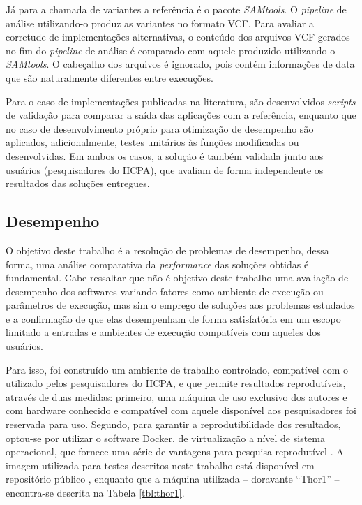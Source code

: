 \documentclass[cic,tc]{iiufrgs}
\begin{document}
Já para a chamada de variantes a referência é o pacote \textit{SAMtools}. O
\textit{pipeline} de análise utilizando-o produz as variantes no formato VCF.
Para avaliar a corretude de implementações alternativas, o conteúdo dos
arquivos VCF gerados no fim do \textit{pipeline} de análise é comparado com
aquele produzido utilizando o \textit{SAMtools}. O cabeçalho dos arquivos é
ignorado, pois contém informações de data que são naturalmente diferentes entre
execuções.

Para o caso de implementações publicadas na literatura, são desenvolvidos
\textit{scripts} de validação para comparar a saída das aplicações com a
referência, enquanto que no caso de desenvolvimento próprio para otimização de
desempenho são aplicados, adicionalmente, testes unitários às funções
modificadas ou desenvolvidas. Em ambos os casos, a solução é também validada
junto aos usuários (pesquisadores do HCPA), que avaliam de forma independente
os resultados das soluções entregues.

\subsection{Desempenho}
\label{sec:perfmethod}

O objetivo deste trabalho é a resolução de problemas de desempenho, dessa
forma, uma análise comparativa da \textit{performance} das soluções obtidas é
fundamental. Cabe ressaltar que não é objetivo deste trabalho uma avaliação de
desempenho dos softwares variando fatores como ambiente de execução ou
parâmetros de execução, mas sim o emprego de soluções aos problemas estudados e
a confirmação de que elas desempenham de forma satisfatória em um escopo
limitado a entradas e ambientes de execução compatíveis com aqueles dos
usuários.

Para isso, foi construído um ambiente de trabalho controlado, compatível com o
utilizado pelos pesquisadores do HCPA, e que permite resultados reprodutíveis,
através de duas medidas: primeiro, uma máquina de uso exclusivo dos autores e
com hardware conhecido e compatível com aquele disponível aos pesquisadores foi
reservada para uso. Segundo, para garantir a reprodutibilidade dos resultados,
optou-se por utilizar o software Docker, de virtualização a nível de sistema
operacional, que fornece uma série de vantagens para pesquisa reprodutível
\cite{boettiger2015introduction}. A imagem utilizada para testes descritos
neste trabalho está disponível em repositório público \cite{dockerme}, enquanto
que a máquina utilizada -- doravante ``Thor1'' -- encontra-se descrita na
Tabela \ref{tbl:thor1}.
\end{document}
